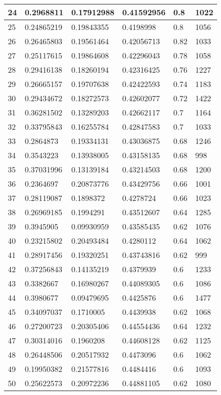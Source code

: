 \begin{longtable}{|l|l|l|l|l|l|}
24 & 0.2968811 & 0.17912988 & 0.41592956 & 0.8 & 1022 \\ \hline 
25 & 0.24865219 & 0.19843355 & 0.4198998 & 0.8 & 1056 \\ \hline 
26 & 0.26465803 & 0.19561464 & 0.42056713 & 0.82 & 1033 \\ \hline 
27 & 0.25117615 & 0.19864608 & 0.42296043 & 0.78 & 1058 \\ \hline 
28 & 0.29416138 & 0.18260194 & 0.42316425 & 0.76 & 1227 \\ \hline 
29 & 0.26665157 & 0.19707638 & 0.42422593 & 0.74 & 1183 \\ \hline 
30 & 0.29434672 & 0.18272573 & 0.42602077 & 0.72 & 1422 \\ \hline 
31 & 0.36281502 & 0.13289203 & 0.42662117 & 0.7 & 1164 \\ \hline 
32 & 0.33795843 & 0.16255784 & 0.42847583 & 0.7 & 1033 \\ \hline 
33 & 0.2864873 & 0.19334131 & 0.43036875 & 0.68 & 1246 \\ \hline 
34 & 0.3543223 & 0.13938005 & 0.43158135 & 0.68 & 998 \\ \hline 
35 & 0.37031996 & 0.13139184 & 0.43214503 & 0.68 & 1200 \\ \hline 
36 & 0.2364697 & 0.20873776 & 0.43429756 & 0.66 & 1001 \\ \hline 
37 & 0.28119087 & 0.1898372 & 0.4278724 & 0.66 & 1023 \\ \hline 
38 & 0.26969185 & 0.1994291 & 0.43512607 & 0.64 & 1285 \\ \hline 
39 & 0.3945905 & 0.09930959 & 0.43585435 & 0.62 & 1076 \\ \hline 
40 & 0.23215802 & 0.20493484 & 0.4280112 & 0.64 & 1062 \\ \hline 
41 & 0.28917456 & 0.19320251 & 0.43743816 & 0.62 & 999 \\ \hline 
42 & 0.37256843 & 0.14135219 & 0.4379939 & 0.6 & 1233 \\ \hline 
43 & 0.3382667 & 0.16980267 & 0.44089305 & 0.6 & 1086 \\ \hline 
44 & 0.3980677 & 0.09479695 & 0.4425876 & 0.6 & 1477 \\ \hline 
45 & 0.34097037 & 0.1710005 & 0.4439938 & 0.62 & 1068 \\ \hline 
46 & 0.27200723 & 0.20305406 & 0.44554436 & 0.64 & 1232 \\ \hline 
47 & 0.30314016 & 0.1960208 & 0.44608128 & 0.62 & 1125 \\ \hline 
48 & 0.26448506 & 0.20517932 & 0.4473096 & 0.6 & 1062 \\ \hline 
49 & 0.19950382 & 0.21577816 & 0.4484416 & 0.6 & 1093 \\ \hline 
50 & 0.25622573 & 0.20972236 & 0.44881105 & 0.62 & 1080 \\ \hline 
\end{longtable}